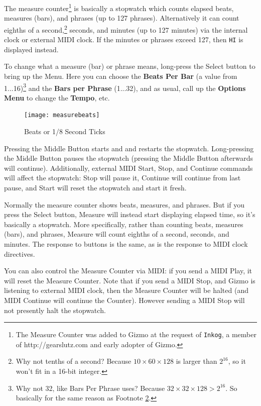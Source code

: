 \documentclass{article}
\begin{document}
	The measure counter\footnote{The Measure Counter was added to Gizmo at the request of \texttt{Inkog}, a member of http:/\!/gearslutz.com and early adopter of Gizmo.} is basically a stopwatch which counts elapsed beats, measures (bars), and phrases (up to 127 phrases).  Alternatively it can count eighths of a second,\footnote{\label{footnotetenths}Why not tenths of a second?  Because \(10 \times 60 \times 128\) is larger than \(2^{16}\), so it won't fit in a 16-bit integer.} seconds, and minutes (up to 127 minutes) via the internal clock or external MIDI clock.  If the minutes or phrases exceed 127, then \texttt{HI} is displayed instead.
	
	To change what a measure (bar) or phrase means, long-press the Select button to bring up the Menu.  Here you can choose the {\bf Beats Per Bar} (a value from 1...16)\footnote{Why not 32, like Bars Per Phrase uses?  Because \(32 \times 32 \times 128 > 2^{16}\).  So basically for the same reason as Footnote \ref{footnotetenths}.} and the {\bf Bars per Phrase} (1...32), and as usual, call up the {\bf Options Menu} to change the {\bf Tempo}, etc.
	
\begin{figure}
\texttt{[image: measurebeats]}
\vspace{-2em}\caption{\small Beats or 1/8 Second Ticks}\vspace{-3em}
\label{midichannelvalues}
\end{figure}


	Pressing the Middle Button starts and and restarts the stopwatch.  Long-pressing the Middle Button pauses the stopwatch (pressing the Middle Button afterwards will continue).  Additionally, external MIDI Start, Stop, and Continue commands will affect the stopwatch: Stop will pause it, Continue will continue from last pause, and Start will reset the stopwatch and start it fresh.

	Normally the measure counter shows beats, measures, and phrases.  But if you press the Select button, Measure will instead start displaying elapsed time, so it's basically a stopwatch.  More specifically, rather than counting beats, measures (bars), and phrases, Measure will count eighths of a second, seconds, and minutes.  The response to buttons is the same, as is the response to MIDI clock directives.

	You can also control the Measure Counter via MIDI: if you send a MIDI Play, it will reset the Measure Counter.  Note that if you send a MIDI Stop, and Gizmo is listening to external MIDI clock, then the Measure Counter will be halted (and MIDI Continue will continue the Counter).  However sending a MIDI Stop will not presently halt the stopwatch.
\end{document}
